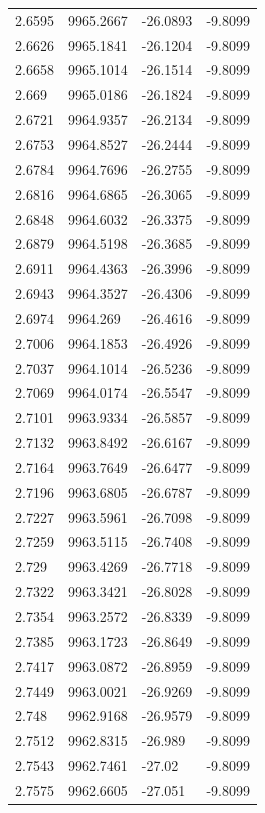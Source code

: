 \begin{table}[H]
\begin{tabular}{llll}
2.6595 & 9965.2667 & -26.0893 & -9.8099 \\
2.6626 & 9965.1841 & -26.1204 & -9.8099 \\
2.6658 & 9965.1014 & -26.1514 & -9.8099 \\
2.669 & 9965.0186 & -26.1824 & -9.8099 \\
2.6721 & 9964.9357 & -26.2134 & -9.8099 \\
2.6753 & 9964.8527 & -26.2444 & -9.8099 \\
2.6784 & 9964.7696 & -26.2755 & -9.8099 \\
2.6816 & 9964.6865 & -26.3065 & -9.8099 \\
2.6848 & 9964.6032 & -26.3375 & -9.8099 \\
2.6879 & 9964.5198 & -26.3685 & -9.8099 \\
2.6911 & 9964.4363 & -26.3996 & -9.8099 \\
2.6943 & 9964.3527 & -26.4306 & -9.8099 \\
2.6974 & 9964.269 & -26.4616 & -9.8099 \\
2.7006 & 9964.1853 & -26.4926 & -9.8099 \\
2.7037 & 9964.1014 & -26.5236 & -9.8099 \\
2.7069 & 9964.0174 & -26.5547 & -9.8099 \\
2.7101 & 9963.9334 & -26.5857 & -9.8099 \\
2.7132 & 9963.8492 & -26.6167 & -9.8099 \\
2.7164 & 9963.7649 & -26.6477 & -9.8099 \\
2.7196 & 9963.6805 & -26.6787 & -9.8099 \\
2.7227 & 9963.5961 & -26.7098 & -9.8099 \\
2.7259 & 9963.5115 & -26.7408 & -9.8099 \\
2.729 & 9963.4269 & -26.7718 & -9.8099 \\
2.7322 & 9963.3421 & -26.8028 & -9.8099 \\
2.7354 & 9963.2572 & -26.8339 & -9.8099 \\
2.7385 & 9963.1723 & -26.8649 & -9.8099 \\
2.7417 & 9963.0872 & -26.8959 & -9.8099 \\
2.7449 & 9963.0021 & -26.9269 & -9.8099 \\
2.748 & 9962.9168 & -26.9579 & -9.8099 \\
2.7512 & 9962.8315 & -26.989 & -9.8099 \\
2.7543 & 9962.7461 & -27.02 & -9.8099 \\
2.7575 & 9962.6605 & -27.051 & -9.8099 \\

\end{tabular}
\end{table}
